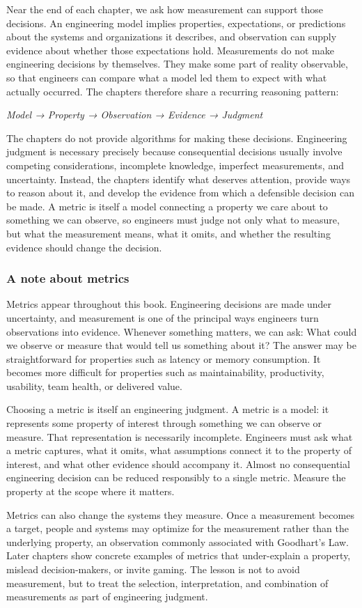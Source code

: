 Near the end of each chapter, we ask how measurement can support those decisions. An engineering
model implies properties, expectations, or predictions about the systems and organizations it
describes, and observation can supply evidence about whether those expectations hold. Measurements do
not make engineering decisions by themselves. They make some part of reality observable, so that
engineers can compare what a model led them to expect with what actually occurred. The chapters
therefore share a recurring reasoning pattern:

\emph{Model → Property → Observation → Evidence → Judgment}

The chapters do not provide algorithms for making these decisions. Engineering judgment is necessary
precisely because consequential decisions usually involve competing considerations, incomplete
knowledge, imperfect measurements, and uncertainty. Instead, the chapters identify what deserves
attention, provide ways to reason about it, and develop the evidence from which a defensible decision
can be made. A metric is itself a model connecting a property we care about to something we can
observe, so engineers must judge not only what to measure, but what the measurement means, what it
omits, and whether the resulting evidence should change the decision.

\subsubsection{A note about metrics}\label{a-note-about-metrics}

Metrics appear throughout this book. Engineering decisions are made under uncertainty, and
measurement is one of the principal ways engineers turn observations into evidence. Whenever
something matters, we can ask: What could we observe or measure that would tell us something about
it? The answer may be straightforward for properties such as latency or memory consumption. It
becomes more difficult for properties such as maintainability, productivity, usability, team health,
or delivered value.

Choosing a metric is itself an engineering judgment. A metric is a model: it represents some property
of interest through something we can observe or measure. That representation is necessarily
incomplete. Engineers must ask what a metric captures, what it omits, what assumptions connect it to
the property of interest, and what other evidence should accompany it. Almost no consequential
engineering decision can be reduced responsibly to a single metric. Measure the property at the scope
where it matters.

Metrics can also change the systems they measure. Once a measurement becomes a target, people and
systems may optimize for the measurement rather than the underlying property, an observation commonly
associated with Goodhart's Law. Later chapters show concrete examples of metrics that under-explain a
property, mislead decision-makers, or invite gaming. The lesson is not to avoid measurement, but to
treat the selection, interpretation, and combination of measurements as part of engineering judgment.
